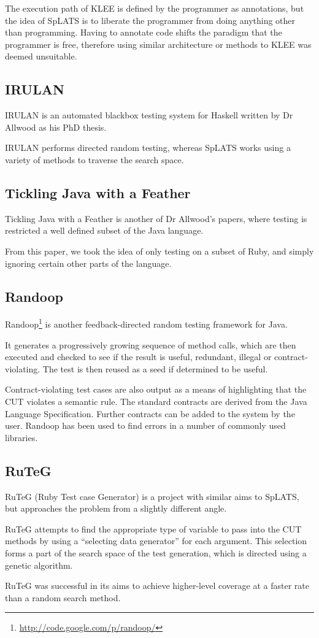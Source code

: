   The execution path of KLEE is defined by the programmer as annotations, but the idea of SpLATS is to liberate the programmer from doing anything other than programming. Having to annotate code shifts the paradigm that the programmer is free, therefore using similar architecture or methods to KLEE was deemed unsuitable.

  \subsection{IRULAN}
    IRULAN\cite{irulan} is an 
    automated blackbox testing system for Haskell written by Dr Allwood 
    as his PhD thesis.

    IRULAN performs directed random testing, whereas SpLATS works using a variety 
    of methods to traverse the search space.

  \subsection{Tickling Java with a Feather}
    Tickling Java with a Feather\cite{tjwaf} is another of Dr Allwood's papers, where testing is restricted a well defined subset of the Java language. 

    From this paper, we took the idea of only testing on a subset of Ruby, and 
    simply ignoring certain other parts of the language.


  \subsection{Randoop}
    Randoop\cite{randoop}\footnote{\url{http://code.google.com/p/randoop/}} is another
feedback-directed random testing framework for Java.

    It generates a progressively growing sequence of method calls, which are
then executed and checked to see if the result is useful, redundant, illegal or
contract-violating. The test is then reused as a seed if determined to be
useful.

    Contract-violating test cases are also output as a means of highlighting
that the CUT violates a semantic rule. The standard contracts are derived from
the Java Language Specification. Further contracts can be added to the system by
the user. Randoop has been used to find errors in a number of commonly used libraries.

  \subsection{RuTeG}
    RuTeG\cite{ruteg} (Ruby Test case Generator) is a project with similar aims to SpLATS, but approaches the problem from a slightly different angle.

RuTeG attempts to find the appropriate type of variable to pass into the CUT
methods by using a ``selecting data generator'' for each argument. This selection
forms a part of the search space of the test generation, which is directed using
a genetic algorithm.

RuTeG was successful in its aims to achieve higher-level coverage at a faster
rate than a random search method.
